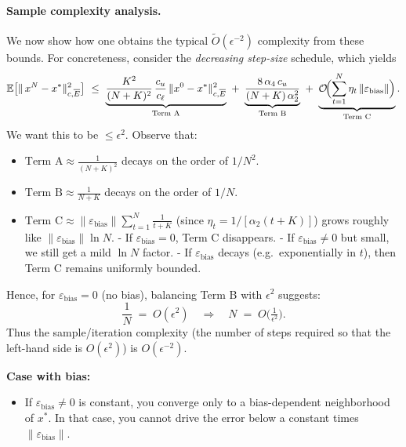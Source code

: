 \begin{theorem}
\paragraph{Sample complexity analysis.}
We now show how one obtains the typical \(\tilde{O}(\epsilon^{-2})\) complexity from these bounds.  For concreteness, consider the \emph{decreasing step-size} schedule, which yields 
\begin{align*}
\mathbb{E}\bigl[\|\,x^N - x^*\|_{c,\overline{E}}^2\bigr]
~\le~
\underbrace{\frac{K^2}{(N+K)^2}\,\frac{c_u}{c_\ell}\,\|x^0 - x^*\|_{c,\overline{E}}^2}_{\text{Term A}}
~+~
\underbrace{\frac{8\,\alpha_4\,c_u}{(N+K)\,\alpha_2^2}}_{\text{Term B}}
~+~
\underbrace{\mathcal{O}\!\Bigl(\sum_{t=1}^N \eta_t\,\|\varepsilon_{\text{bias}}\|\Bigr)}_{\text{Term C}}.
\end{align*}
We want this to be \(\le \epsilon^2\).  Observe that:
\begin{itemize}
\item \(\text{Term A} \approx \frac{1}{(N+K)^2}\) decays on the order of \(1/N^2\).
\item \(\text{Term B} \approx \frac{1}{N+K}\) decays on the order of \(1/N\).
\item \(\text{Term C} \approx \|\varepsilon_{\text{bias}}\|\sum_{t=1}^N \frac{1}{t+K}\) (since \(\eta_t = 1/[\alpha_2(t+K)]\)) grows roughly like \(\|\varepsilon_{\text{bias}}\|\ln N\).  
  - If \(\varepsilon_{\text{bias}}=0\), Term C disappears.  
  - If \(\varepsilon_{\text{bias}}\)\(\neq 0\) but small, we still get a mild \(\ln N\) factor.  
  - If \(\varepsilon_{\text{bias}}\) decays (e.g.\ exponentially in \(t\)), then Term C remains uniformly bounded.
\end{itemize}

\noindent
Hence, for \(\varepsilon_{\text{bias}} = 0\) (no bias), balancing Term B with \(\epsilon^2\) suggests:
\[
  \frac{1}{N} \;=\; O(\epsilon^2)
  \quad\Rightarrow\quad 
  N \;=\;O\bigl(\tfrac{1}{\epsilon^2}\bigr).
\]
Thus the sample/iteration complexity (the number of steps required so that the left-hand side is \(O(\epsilon^2)\)) is \(O(\epsilon^{-2})\).  

\smallskip

\noindent
\textbf{Case with bias:}
\begin{itemize}
\item If \(\varepsilon_{\text{bias}}\neq 0\) is constant, you converge only to a bias-dependent neighborhood of \(x^*\).  In that case, you cannot drive the error below a constant times \(\|\varepsilon_{\text{bias}}\|\).  


\end{itemize}
\end{theorem}
